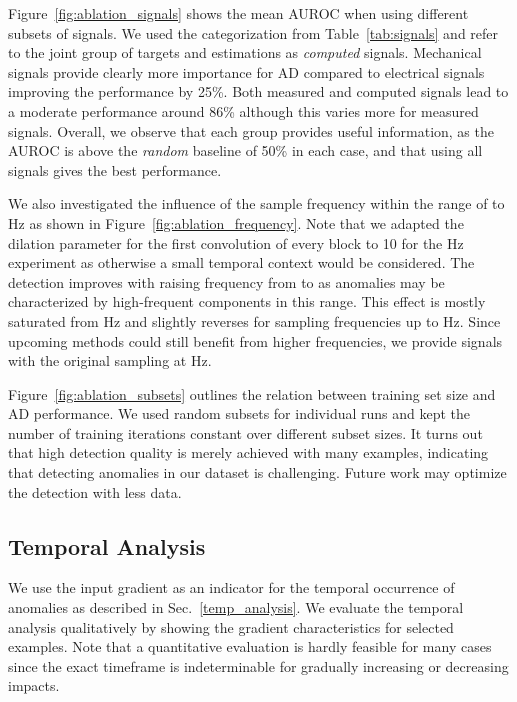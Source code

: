 \documentclass[journal]{IEEEtran}
\begin{document}
Figure~\ref{fig:ablation_signals} shows the mean AUROC when using different subsets of signals.
We used the categorization from Table~\ref{tab:signals} and refer to the joint group of targets and estimations as \textit{computed} signals.
Mechanical signals provide clearly more importance for AD compared to electrical signals improving the performance by 25\%.
Both measured and computed signals lead to a moderate performance around 86\% although this varies more for measured signals.
Overall, we observe that each group provides useful information, as the AUROC is above the \textit{random} baseline of 50\% in each case, and that using all signals gives the best performance.

We also investigated the influence of the sample frequency within the range of  to  Hz as shown in Figure~\ref{fig:ablation_frequency}.
{Note that we adapted the dilation parameter for the first convolution of every block to 10 for the  Hz experiment as otherwise a small temporal context would be considered.}
The detection improves with raising frequency {from  to  as anomalies may be characterized by high-frequent components in this range}.
This effect is mostly saturated {from  Hz and slightly reverses for sampling frequencies up to  Hz.}
Since upcoming methods could still benefit from higher frequencies, we provide signals  with the original sampling at  Hz.



Figure~\ref{fig:ablation_subsets} outlines the relation between training set size and AD performance.
We used random subsets for individual runs {and kept the number of training iterations constant over different subset sizes.}
It turns out that high detection quality is merely achieved with many examples, indicating that detecting anomalies in our dataset is challenging.
Future work may optimize the detection with less data.
\subsection{Temporal Analysis}
We use the input gradient as an indicator for the temporal occurrence of anomalies as described in Sec.~\ref{temp_analysis}.
We evaluate the temporal analysis qualitatively by showing the gradient characteristics for selected examples.
Note that a quantitative evaluation is hardly feasible for many cases since the exact timeframe is indeterminable for gradually increasing or decreasing impacts.
\end{document}
